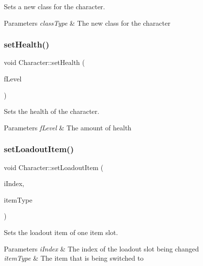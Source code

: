 Sets a new class for the character. 


\begin{DoxyParams}{Parameters}
{\em class\+Type} & The new class for the character \\
\hline
\end{DoxyParams}
\mbox{\label{class_character_a272568879408954cd2e6dc18520be441}} 
\subsubsection{\texorpdfstring{set\+Health()}{setHealth()}}
{\footnotesize\ttfamily void Character\+::set\+Health (\begin{DoxyParamCaption}\item[{float}]{f\+Level }\end{DoxyParamCaption})}



Sets the health of the character. 


\begin{DoxyParams}{Parameters}
{\em f\+Level} & The amount of health \\
\hline
\end{DoxyParams}
\mbox{\label{class_character_a6aafe288415f66eef9f244f72406415d}} 
\subsubsection{\texorpdfstring{set\+Loadout\+Item()}{setLoadoutItem()}}
{\footnotesize\ttfamily void Character\+::set\+Loadout\+Item (\begin{DoxyParamCaption}\item[{int}]{i\+Index,  }\item[{\hyperlink{_character_8h_a00971beaa8e80879643e933973580d61}{loadout\+Item}}]{item\+Type }\end{DoxyParamCaption})}



Sets the loadout item of one item slot. 


\begin{DoxyParams}{Parameters}
{\em i\+Index} & The index of the loadout slot being changed \\
\hline
{\em item\+Type} & The item that is being switched to \\
\hline
\end{DoxyParams}
\mbox{\label{class_character_a8411872ea649afb42dea6f530af79704}} 
